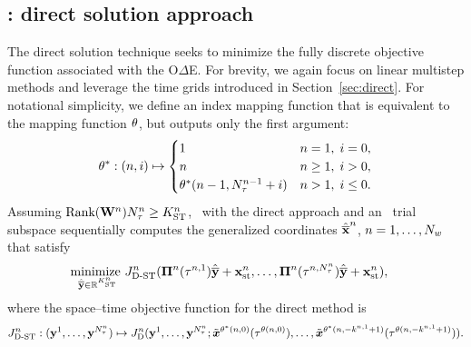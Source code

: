 \subsection{\spaceTimeAcronym: direct solution approach}
The direct solution technique seeks to minimize the fully discrete objective function associated with the O$\Delta$E. For brevity, we again focus on linear multistep methods and leverage the time grids introduced in Section~\ref{sec:direct}. For notational simplicity, we define an index mapping function that is 
equivalent to the mapping function $\theta$, but outputs only the first argument: 
$$\theta^*: (n,i) \mapsto 
\begin{cases}
1 & n=1, \; i = 0,\\
n & n \ge 1, \; i > 0, \\
\theta^*(n-1,N_{\tau}^{n-1}+i) & n > 1, \; i \le 0.
\end{cases}$$
Assuming $\text{Rank}(\mathbf{W}^{n})N_{\tau}^{n} \ge K_{\text{ST}}^{n}$, \methodAcronym\ with the direct approach and an \spaceTimeAcronym\ trial subspace sequentially computes the generalized coordinates $\hat{\mathbf{\overline{x}}}^{n}$, $n=1,\ldots,N_w$ that satisfy
 \begin{equation}\label{eq:obj_gen_lms_final_st}
\begin{split}
& \underset{\stgenstatey \in \RR{\stdimArg{n}}}{\text{minimize } }
\objectiveArgLMS{n}_{\text{D-ST}} (\stbasisArg{n}{\timeWindowArg{n}{1}} \stgenstatey + \stateInterceptSTArg{n},\ldots,\stbasisArg{n}{\timeWindowArg{n}{\nstepsArg{n}}} \stgenstatey + \stateInterceptSTArg{n}),%
\end{split} 
\end{equation}
where the space--time objective function for the direct method is
$$
J^{n}_{\text{D-ST}}  :  (\mathbf{y}^{1},\ldots,\mathbf{y}^{N_{\tau}^{n}}) \mapsto J^{n}_{\text{D}}(\mathbf{y}^{1},\ldots,\mathbf{y}^{N_{\tau}^{n}}; \tilde{\boldsymbol x}^{\theta^*(n,0)}(\tau^{\theta(n,0)}),\ldots, 
 \tilde{\boldsymbol x}^{\theta^*(n,-k^{n,1}+1)}(\tau^{\theta(n,-k^{n,1}+1)})).
$$
